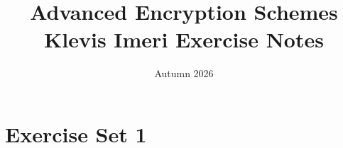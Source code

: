 \documentclass[12pt,a4paper]{article}
\title{Advanced Encryption Schemes\\\large Klevis Imeri Exercise Notes}
\author{}
\date{Autumn 2026}
\begin{document}
\maketitle
\tableofcontents

\section{Exercise Set 1}

\begin{problem}
\end{problem}
\begin{solution}
\end{solution}

\begin{problem}
\end{problem}
\begin{solution}
\end{solution}

\begin{problem}
\end{problem}
\begin{solution}
\end{solution}

\begin{problem}
\end{problem}
\begin{solution}
\end{solution}
\end{document}
